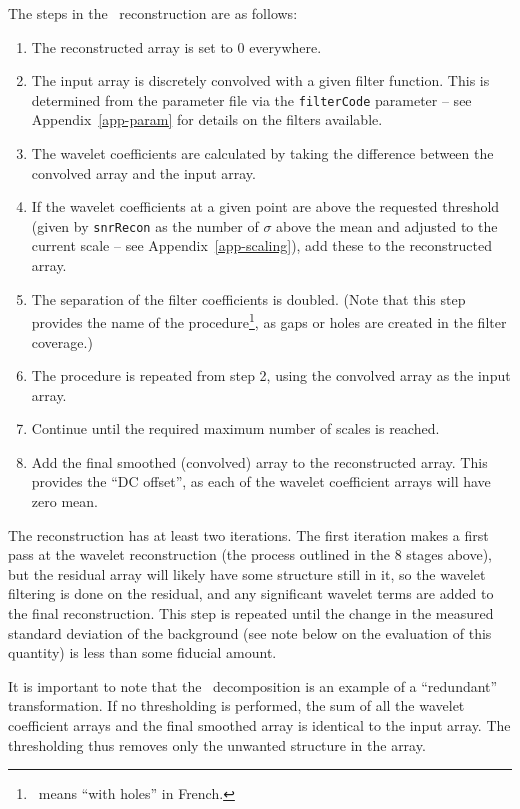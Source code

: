 The steps in the \atrous\ reconstruction are as follows:
\begin{enumerate}
\item The reconstructed array is set to 0 everywhere.
\item The input array is discretely convolved with a given filter
  function. This is determined from the parameter file via the
  \texttt{filterCode} parameter -- see Appendix~\ref{app-param} for
  details on the filters available.
\item The wavelet coefficients are calculated by taking the difference
  between the convolved array and the input array.
\item If the wavelet coefficients at a given point are above the
  requested threshold (given by \texttt{snrRecon} as the number of
  $\sigma$ above the mean and adjusted to the current scale -- see
  Appendix~\ref{app-scaling}), add these to the reconstructed array.
\item The separation of the filter coefficients is doubled. (Note that
  this step provides the name of the procedure\footnote{\atrous\ means
  ``with holes'' in French.}, as gaps or holes are created in the
  filter coverage.)
\item The procedure is repeated from step 2, using the convolved array
  as the input array.
\item Continue until the required maximum number of scales is reached.
\item Add the final smoothed (\ie convolved) array to the
  reconstructed array. This provides the ``DC offset'', as each of the
  wavelet coefficient arrays will have zero mean.
\end{enumerate}

The reconstruction has at least two iterations. The first iteration
makes a first pass at the wavelet reconstruction (the process outlined
in the 8 stages above), but the residual array will likely have some
structure still in it, so the wavelet filtering is done on the
residual, and any significant wavelet terms are added to the final
reconstruction. This step is repeated until the change in the measured
standard deviation of the background (see note below on the evaluation
of this quantity) is less than some fiducial amount.

It is important to note that the \atrous\ decomposition is an example
of a ``redundant'' transformation. If no thresholding is performed,
the sum of all the wavelet coefficient arrays and the final smoothed
array is identical to the input array. The thresholding thus removes
only the unwanted structure in the array.

